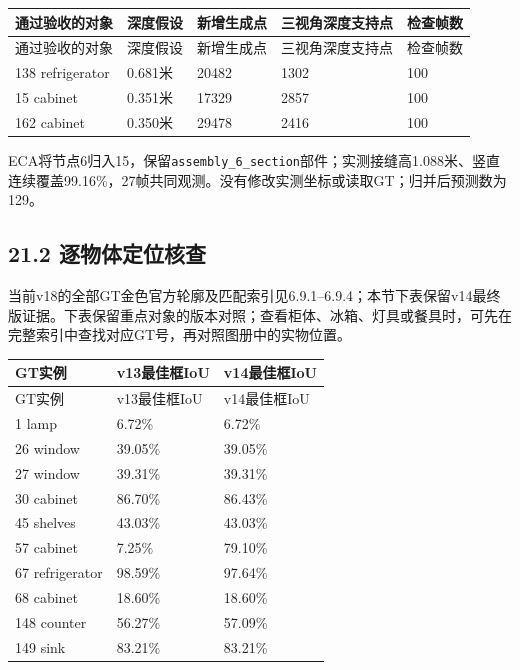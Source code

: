 \documentclass[UTF8,fontset=fandol]{ctexart}
\begin{document}
{\small
\begin{longtable}{|p{}|p{}|p{}|p{}|p{}|}
\hline
通过验收的对象 & 深度假设 & 新增生成点 & 三视角深度支持点 & 检查帧数 \\ \hline
\endfirsthead
\hline
通过验收的对象 & 深度假设 & 新增生成点 & 三视角深度支持点 & 检查帧数 \\ \hline
\endhead
138 refrigerator & 0.681米 & 20482 & 1302 & 100 \\ \hline
15 cabinet & 0.351米 & 17329 & 2857 & 100 \\ \hline
162 cabinet & 0.350米 & 29478 & 2416 & 100 \\ \hline
\end{longtable}
}

ECA将节点6归入15，保留\texttt{assembly\_\allowbreak{}6\_\allowbreak{}section}部件；实测接缝高1.088米、竖直连续覆盖99.16\%，27帧共同观测。没有修改实测坐标或读取GT；归并后预测数为129。



\subsection*{21.2 逐物体定位核查}

当前v18的全部GT金色官方轮廓及匹配索引见6.9.1–6.9.4；本节下表保留v14最终版证据。下表保留重点对象的版本对照；查看柜体、冰箱、灯具或餐具时，可先在完整索引中查找对应GT号，再对照图册中的实物位置。



{\small
\begin{longtable}{|p{}|p{}|p{}|}
\hline
GT实例 & v13最佳框IoU & v14最佳框IoU \\ \hline
\endfirsthead
\hline
GT实例 & v13最佳框IoU & v14最佳框IoU \\ \hline
\endhead
1 lamp & 6.72\% & 6.72\% \\ \hline
26 window & 39.05\% & 39.05\% \\ \hline
27 window & 39.31\% & 39.31\% \\ \hline
30 cabinet & 86.70\% & 86.43\% \\ \hline
45 shelves & 43.03\% & 43.03\% \\ \hline
57 cabinet & 7.25\% & 79.10\% \\ \hline
67 refrigerator & 98.59\% & 97.64\% \\ \hline
68 cabinet & 18.60\% & 18.60\% \\ \hline
148 counter & 56.27\% & 57.09\% \\ \hline
149 sink & 83.21\% & 83.21\% \\ \hline
\end{longtable}
}
\end{document}
